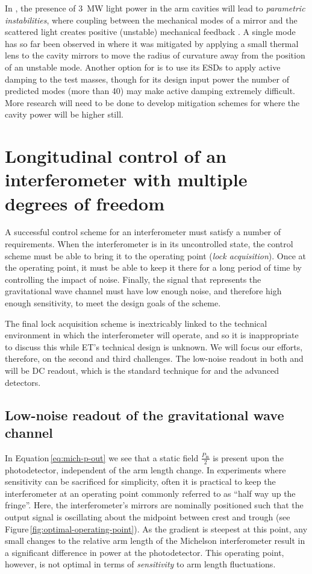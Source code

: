 In \ETHF{}, the presence of \SI{3}{\mega\watt} light power in the arm cavities will lead to \emph{parametric instabilities}, where coupling between the mechanical modes of a mirror and the scattered light creates positive (unstable) mechanical feedback \cite{Braginsky2001}. A single mode has so far been observed in \ALIGO{} \cite{Evans2015} where it was mitigated by applying a small thermal lens to the cavity mirrors to move the radius of curvature away from the position of an unstable mode. Another option for \ALIGO{} is to use its \glspl{ESD} to apply active damping to the test masses, though for its design input power the number of predicted modes (more than 40) may make active damping extremely difficult. More research will need to be done to develop mitigation schemes for \ETHF{} where the cavity power will be higher still.

\section{Longitudinal control of an interferometer with multiple degrees of freedom}
A successful control scheme for an interferometer must satisfy a number of requirements. When the interferometer is in its uncontrolled state, the control scheme must be able to bring it to the operating point (\emph{lock acquisition}). Once at the operating point, it must be able to keep it there for a long period of time by controlling the impact of noise. Finally, the signal that represents the gravitational wave channel must have low enough noise, and therefore high enough sensitivity, to meet the design goals of the scheme.

The final lock acquisition scheme is inextricably linked to the technical environment in which the interferometer will operate, and so it is inappropriate to discuss this while \gls{ET}'s technical design is unknown. We will focus our efforts, therefore, on the second and third challenges. The low-noise readout in both \ETLF{} and \ETHF{} will be \gls{DC} readout, which is the standard technique for \GEOHF{} and the advanced detectors.

\subsection{Low-noise readout of the gravitational wave channel}
In Equation\,\ref{eq:mich-p-out} we see that a static field $\frac{P_{\text{in}}}{2}$ is present upon the photodetector, independent of the arm length change. In experiments where sensitivity can be sacrificed for simplicity, often it is practical to keep the interferometer at an operating point commonly referred to as ``half way up the fringe''. Here, the interferometer's mirrors are nominally positioned such that the output signal is oscillating about the midpoint between crest and trough (see Figure\,\ref{fig:optimal-operating-point}). As the gradient is steepest at this point, any small changes to the relative arm length of the Michelson interferometer result in a significant difference in power at the photodetector. This operating point, however, is not optimal in terms of \emph{sensitivity} to arm length fluctuations.


